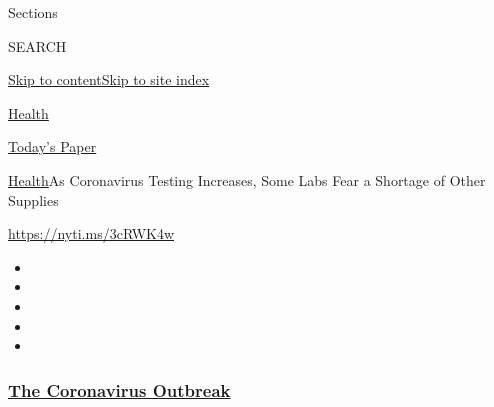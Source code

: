 Sections

SEARCH

\protect\hyperlink{site-content}{Skip to
content}\protect\hyperlink{site-index}{Skip to site index}

\href{https://www.nytimes3xbfgragh.onion/section/health}{Health}

\href{https://myaccount.nytimes3xbfgragh.onion/auth/login?response_type=cookie\&client_id=vi}{}

\href{https://www.nytimes3xbfgragh.onion/section/todayspaper}{Today's
Paper}

\href{/section/health}{Health}\textbar{}As Coronavirus Testing
Increases, Some Labs Fear a Shortage of Other Supplies

\url{https://nyti.ms/3cRWK4w}

\begin{itemize}
\item
\item
\item
\item
\item
\end{itemize}

\hypertarget{the-coronavirus-outbreak}{%
\subsubsection{\texorpdfstring{\href{https://www.nytimes3xbfgragh.onion/news-event/coronavirus?name=styln-coronavirus-national\&region=TOP_BANNER\&block=storyline_menu_recirc\&action=click\&pgtype=Article\&impression_id=46380e20-f4b8-11ea-b140-7b2ff790d7ab\&variant=undefined}{The
Coronavirus
Outbreak}}{The Coronavirus Outbreak}}\label{the-coronavirus-outbreak}}

